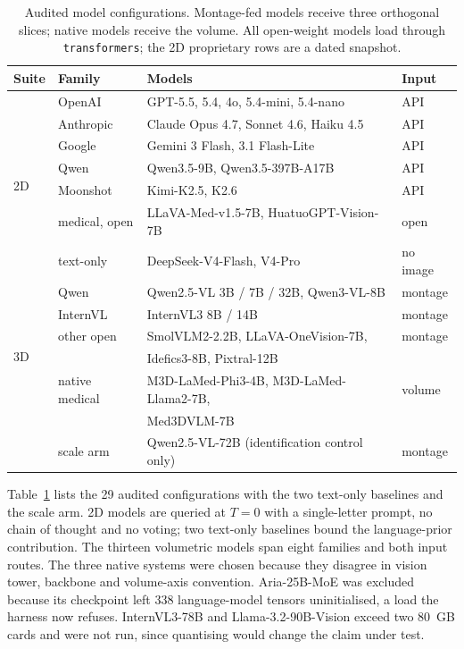 \begin{table}[!t]
\caption{Audited model configurations. Montage-fed models receive three
orthogonal slices; native models receive the volume. All open-weight models
load through \texttt{transformers}; the 2D proprietary rows are a dated
snapshot.}
\label{tab:models}
\centering
\fontsize{7.5}{9}\selectfont
\setlength\tabcolsep{2pt}
\begin{tabular}{llll}
\toprule
Suite & Family & Models & Input \\
\midrule
\multirow{7}{*}{2D}
 & OpenAI & GPT-5.5, 5.4, 4o, 5.4-mini, 5.4-nano & API \\
 & Anthropic & Claude Opus 4.7, Sonnet 4.6, Haiku 4.5 & API \\
 & Google & Gemini 3 Flash, 3.1 Flash-Lite & API \\
 & Qwen & Qwen3.5-9B, Qwen3.5-397B-A17B & API \\
 & Moonshot & Kimi-K2.5, K2.6 & API \\
 & medical, open & LLaVA-Med-v1.5-7B, HuatuoGPT-Vision-7B & open \\
 & text-only & DeepSeek-V4-Flash, V4-Pro & no image \\
\midrule
\multirow{6}{*}{3D}
 & Qwen & Qwen2.5-VL 3B / 7B / 32B, Qwen3-VL-8B & montage \\
 & InternVL & InternVL3 8B / 14B & montage \\
 & other open & SmolVLM2-2.2B, LLaVA-OneVision-7B, & montage \\
 & & Idefics3-8B, Pixtral-12B & \\
 & native medical & M3D-LaMed-Phi3-4B, M3D-LaMed-Llama2-7B, & volume \\
 & & Med3DVLM-7B & \\
 & scale arm & Qwen2.5-VL-72B (identification control only) & montage \\
\bottomrule
\end{tabular}
\end{table}

Table~\ref{tab:models} lists the 29 audited configurations with the two
text-only baselines and the scale arm. 2D models are queried
at $T=0$ with a single-letter prompt, no chain of thought and no voting; two
text-only baselines bound the language-prior contribution. The thirteen
volumetric models span eight families and both input routes. The three
native systems were chosen because they disagree in vision tower, backbone
and volume-axis convention. Aria-25B-MoE was excluded because its checkpoint
left 338 language-model tensors uninitialised, a load the harness now
refuses. InternVL3-78B and Llama-3.2-90B-Vision exceed two 80~GB cards and
were not run, since quantising would change the claim under test.


